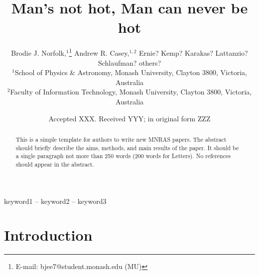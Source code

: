 \documentclass[a4paper,fleqn,usenatbib]{mnras}
\title[Short title, max. 45 characters]{Man's not hot, Man can never be hot}
\author[B. J. Norfolk et al.]{Brodie J. Norfolk,$^{1}$\thanks{E-mail: bjee7@student.monash.edu (MU)}
Andrew R. Casey,$^{1,2}$
Ernie? Kemp? Karakas? Lattanzio? \newauthor
Schlaufman? others?
\\
$^{1}$School of Physics \& Astronomy, Monash University, Clayton 3800, Victoria, Australia\\
$^{2}$Faculty of Information Technology, Monash University, Clayton 3800, Victoria, Australia\\
}
\date{Accepted XXX. Received YYY; in original form ZZZ}
\begin{document}
\label{firstpage}
\pagerange{\pageref{firstpage}--\pageref{lastpage}}
\maketitle

\begin{abstract}
This is a simple template for authors to write new MNRAS papers.
The abstract should briefly describe the aims, methods, and main results of the paper.
It should be a single paragraph not more than 250 words (200 words for Letters).
No references should appear in the abstract.
\end{abstract}

\begin{keywords}
keyword1 -- keyword2 -- keyword3
\end{keywords}


\section{Introduction}




\end{document}
